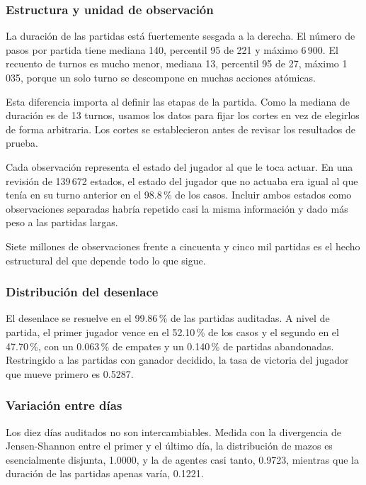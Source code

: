 \subsubsection{Estructura y unidad de observación}

La duración de las partidas está fuertemente sesgada a la derecha. El número
de pasos por partida tiene mediana 140, percentil 95 de 221 y máximo 6\,900.
El recuento de turnos es mucho menor, mediana 13, percentil 95 de 27,
máximo 1\,035, porque un solo turno se descompone en muchas acciones
atómicas.

Esta diferencia importa al definir las etapas de la partida. Como la
mediana de duración es de 13 turnos, usamos los datos para fijar los cortes
en vez de elegirlos de forma arbitraria. Los cortes se establecieron antes
de revisar los resultados de prueba.

Cada observación representa el estado del jugador al que le toca actuar. En
una revisión de 139\,672 estados, el estado del jugador que no actuaba era
igual al que tenía en su turno anterior en el 98.8\,\% de los casos.
Incluir ambos estados como observaciones separadas habría repetido casi la
misma información y dado más peso a las partidas largas.

Siete millones de observaciones frente a cincuenta y cinco mil partidas es el
hecho estructural del que depende todo lo que sigue.

\subsubsection{Distribución del desenlace}

El desenlace se resuelve en el 99.86\,\% de las partidas auditadas. A nivel
de partida, el primer jugador vence en el 52.10\,\% de los casos y el
segundo en el 47.70\,\%, con un 0.063\,\% de empates y un 0.140\,\% de
partidas abandonadas. Restringido a las partidas con ganador decidido, la
tasa de victoria del jugador que mueve primero es 0.5287.

\subsubsection{Variación entre días}

Los diez días auditados no son intercambiables. Medida con la divergencia de
Jensen-Shannon entre el primer y el último día, la distribución de mazos es
esencialmente disjunta, 1.0000, y la de agentes casi tanto, 0.9723,
mientras que la duración de las partidas apenas varía, 0.1221.

